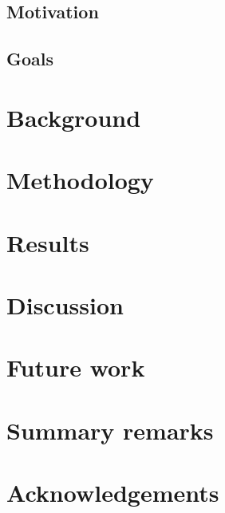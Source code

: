 \documentclass[11pt,a4paper]{article}
\begin{document}
\subsection{Motivation} \label{sec-motivation}
\subsection{Goals} \label{sec-goals}

\newpage

\section{Background} \label{sec-background}

\newpage

\section{Methodology} \label{sec-methodology}

\newpage

\section{Results} \label{sec-results}

\newpage

\section{Discussion} \label{sec-discussion}

\newpage

\section{Future work} \label{sec-future-work}

\newpage

\section{Summary remarks} \label{sec-summary-remarks}

\newpage 

\section*{Acknowledgements}

\newpage


\setlength{\bibhang}{0pt}

\end{document}
